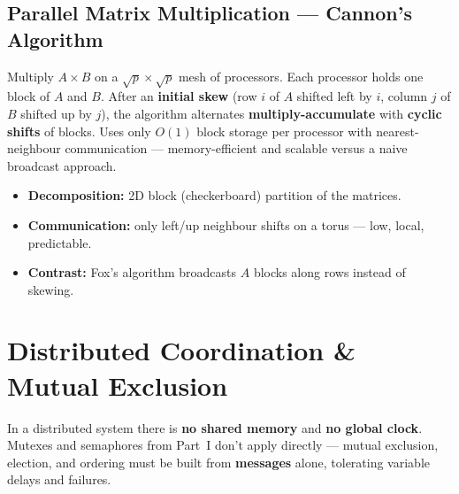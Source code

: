 \documentclass[11pt,a4paper]{article}
\begin{document}
\subsection{Parallel Matrix Multiplication --- Cannon's Algorithm}
\begin{conceptbox}
Multiply $A \times B$ on a $\sqrt{p} \times \sqrt{p}$ mesh of processors. Each processor holds one block of $A$ and $B$. After an \textbf{initial skew} (row $i$ of $A$ shifted left by $i$, column $j$ of $B$ shifted up by $j$), the algorithm alternates \textbf{multiply-accumulate} with \textbf{cyclic shifts} of blocks. Uses only $O(1)$ block storage per processor with nearest-neighbour communication --- memory-efficient and scalable versus a naive broadcast approach.
\end{conceptbox}

\begin{itemize}[leftmargin=*, itemsep=2pt]
  \item \textbf{Decomposition:} 2D block (checkerboard) partition of the matrices.
  \item \textbf{Communication:} only left/up neighbour shifts on a torus --- low, local, predictable.
  \item \textbf{Contrast:} Fox's algorithm broadcasts $A$ blocks along rows instead of skewing.
\end{itemize}

\section{Distributed Coordination \& Mutual Exclusion}

\begin{alertbox}
In a distributed system there is \textbf{no shared memory} and \textbf{no global clock}. Mutexes and semaphores from Part~I don't apply directly --- mutual exclusion, election, and ordering must be built from \textbf{messages} alone, tolerating variable delays and failures.
\end{alertbox}
\end{document}
